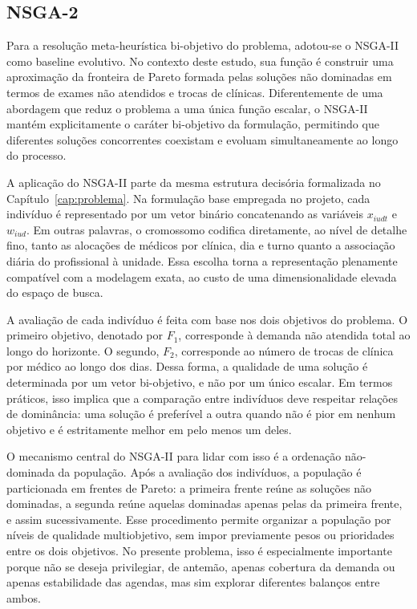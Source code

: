 \subsection{NSGA-2}

Para a resolução meta-heurística bi-objetivo do problema, adotou-se o NSGA-II \cite{Deb_Pratap_Agarwal_Meyarivan_2002} como baseline evolutivo. No contexto deste estudo, sua função é construir uma aproximação da fronteira de Pareto formada pelas soluções não dominadas em termos de exames não atendidos e trocas de clínicas. Diferentemente de uma abordagem que reduz o problema a uma única função escalar, o NSGA-II mantém explicitamente o caráter bi-objetivo da formulação, permitindo que diferentes soluções concorrentes coexistam e evoluam simultaneamente ao longo do processo.

A aplicação do NSGA-II parte da mesma estrutura decisória formalizada no Capítulo~\ref{cap:problema}. Na formulação base empregada no projeto, cada indivíduo é representado por um vetor binário concatenando as variáveis $x_{iudt}$ e $w_{iud}$. Em outras palavras, o cromossomo codifica diretamente, ao nível de detalhe fino, tanto as alocações de médicos por clínica, dia e turno quanto a associação diária do profissional à unidade. Essa escolha torna a representação plenamente compatível com a modelagem exata, ao custo de uma dimensionalidade elevada do espaço de busca.

A avaliação de cada indivíduo é feita com base nos dois objetivos do problema. O primeiro objetivo, denotado por $F_1$, corresponde à demanda não atendida total ao longo do horizonte. O segundo, $F_2$, corresponde ao número de trocas de clínica por médico ao longo dos dias. Dessa forma, a qualidade de uma solução é determinada por um vetor bi-objetivo, e não por um único escalar. Em termos práticos, isso implica que a comparação entre indivíduos deve respeitar relações de dominância: uma solução é preferível a outra quando não é pior em nenhum objetivo e é estritamente melhor em pelo menos um deles.

O mecanismo central do NSGA-II para lidar com isso é a ordenação não-dominada da população. Após a avaliação dos indivíduos, a população é particionada em frentes de Pareto: a primeira frente reúne as soluções não dominadas, a segunda reúne aquelas dominadas apenas pelas da primeira frente, e assim sucessivamente. Esse procedimento permite organizar a população por níveis de qualidade multiobjetivo, sem impor previamente pesos ou prioridades entre os dois objetivos. No presente problema, isso é especialmente importante porque não se deseja privilegiar, de antemão, apenas cobertura da demanda ou apenas estabilidade das agendas, mas sim explorar diferentes balanços entre ambos.


